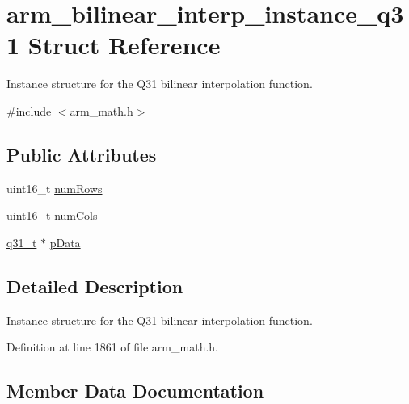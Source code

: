 \hypertarget{structarm__bilinear__interp__instance__q31}{}\section{arm\+\_\+bilinear\+\_\+interp\+\_\+instance\+\_\+q31 Struct Reference}
\label{structarm__bilinear__interp__instance__q31}


Instance structure for the Q31 bilinear interpolation function.  




{\ttfamily \#include $<$arm\+\_\+math.\+h$>$}

\subsection*{Public Attributes}
\begin{DoxyCompactItemize}
\item 
uint16\+\_\+t \hyperlink{structarm__bilinear__interp__instance__q31_a2082e3eac56354d75291f03e96ce4aa5}{num\+Rows}
\item 
uint16\+\_\+t \hyperlink{structarm__bilinear__interp__instance__q31_a6c3eff4eb17ff1d43f170efb84713a2d}{num\+Cols}
\item 
\hyperlink{arm__math_8h_adc89a3547f5324b7b3b95adec3806bc0}{q31\+\_\+t} $\ast$ \hyperlink{structarm__bilinear__interp__instance__q31_a843eae0c9db5f815e77e1aaf9afea358}{p\+Data}
\end{DoxyCompactItemize}


\subsection{Detailed Description}
Instance structure for the Q31 bilinear interpolation function. 

Definition at line 1861 of file arm\+\_\+math.\+h.



\subsection{Member Data Documentation}
\mbox{\label{structarm__bilinear__interp__instance__q31_a6c3eff4eb17ff1d43f170efb84713a2d}} 
